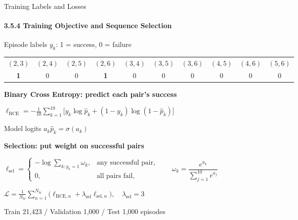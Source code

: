 \documentclass[t,10pt,handout]{beamer}
\newenvironment{slidebody}{\begin{minipage}[t][68.5mm][s]{\linewidth}\vspace{0pt}}{\par\vspace{0pt}\end{minipage}}
\begin{document}
\begin{frame}[label=selector-training]{Training Labels and Losses}
  \framesubtitle{3.5.4 Training Objective and Sequence Selection}
  \begin{slidebody}
    \begin{block}{Episode labels $y_k$: 1 = success, 0 = failure}
      \centering
      \setlength{\tabcolsep}{3pt}
      \begin{tabular}{cccccccccc}
        $(2,3)$                               & $(2,4)$ & $(2,5)$ & $(2,6)$                               & $(3,4)$ & $(3,5)$ & $(3,6)$ & $(4,5)$ & $(4,6)$ & $(5,6)$ \\
        \textcolor{EmphasisGreen}{\textbf{1}} & 0       & 0       & \textcolor{EmphasisGreen}{\textbf{1}} & 0       & 0       & 0       & 0       & 0       & 0
      \end{tabular}
    \end{block}
    \vfill
    {\color{EmphasisBlue}\textbf{Binary Cross Entropy: predict each pair's success}}\par
    \vspace{2mm}
    {\centering\(
      \ell_{\mathrm{BCE}}=-\frac1{10}\sum_{k=1}^{10}
      \bigl[y_k\log\hat p_k+(1-y_k)\log(1-\hat p_k)\bigr]
      \)\par\vspace{1mm}
      Model logits $a_k$\quad $\hat p_k=\sigma(a_k)$\par}
    \vfill
    {\color{EmphasisBlue}\textbf{Selection: put weight on successful pairs}}\par
    \vspace{2mm}
    {\centering\(
    \ell_{\mathrm{sel}}=
    \begin{cases}
      -\log\sum_{k:y_k=1}\omega_k, & \text{any successful pair}, \\[1mm]
      0,                           & \text{all pairs fail},
    \end{cases}
    \qquad \omega_k=\dfrac{e^{a_k}}{\sum_{j=1}^{10}e^{a_j}}
    \)\par}
    \vfill
    {\centering\(\mathcal L=\frac1{N_{\mathrm{tr}}}\sum_{n=1}^{N_{\mathrm{tr}}}
    \bigl(\ell_{\mathrm{BCE},n}+\lambda_{\mathrm{sel}}\ell_{\mathrm{sel},n}\bigr),\quad\lambda_{\mathrm{sel}}=3\)\par}
    \vspace{2mm}
    \centering\normalsize Train 21,423 / Validation 1,000 / Test 1,000 episodes
  \end{slidebody}
\end{frame}
\end{document}
